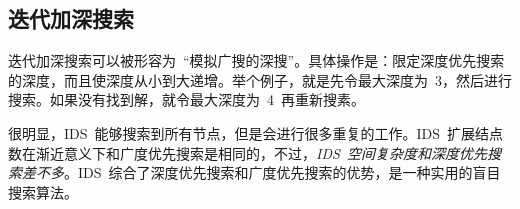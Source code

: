 \subsection{迭代加深搜索}
	迭代加深搜索可以被形容为~``模拟广搜的深搜''。具体操作是：限定深度优先搜索的深度，而且使深度从小到大递增。举个例子，就是先令最大深度为~3，然后进行搜索。如果没有找到解，就令最大深度为~4~再重新搜素。
	
	很明显，IDS~能够搜索到所有节点，但是会进行很多重复的工作。IDS~扩展结点数在渐近意义下和广度优先搜索是相同的，不过，\emph{IDS~空间复杂度和深度优先搜索差不多}。IDS~综合了深度优先搜索和广度优先搜索的优势，是一种实用的盲目搜索算法。
	
	